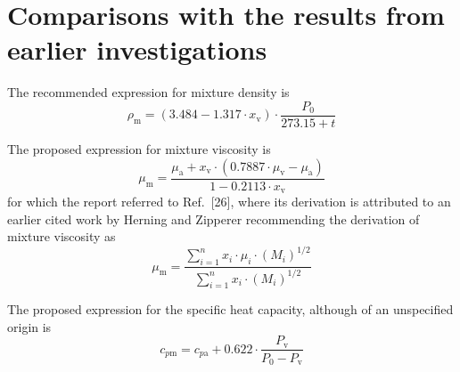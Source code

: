 \documentclass[11pt]{article}
\begin{document}
\section{Comparisons with the results from earlier investigations}


\noindent The recommended expression for mixture density is
\begin{equation}
\rho_\mathrm{m} = (3.484 - 1.317\cdot x_\mathrm{v})
  \cdot\frac{P_0}{273.15+t}
\end{equation}


\noindent The proposed expression for mixture viscosity is
\begin{equation}
\mu_\mathrm{m} = \frac{\mu_\mathrm{a}
  + x_\mathrm{v}\cdot(0.7887\cdot\mu_\mathrm{v}-\mu_\mathrm{a})}
  {1 - 0.2113\cdot x_\mathrm{v}}
\end{equation}
for which the report referred to Ref.~[26], where its derivation is
attributed to an earlier cited work by Herning and Zipperer
recommending the derivation of mixture viscosity as
\begin{equation}
\mu_\mathrm{m} = \frac{\sum_{i=1}^{n} x_i\cdot\mu_i\cdot(M_i)^{1/2}}
                      {\sum_{i=1}^{n} x_i\cdot(M_i)^{1/2}}
\end{equation}


\noindent The proposed expression for the specific heat capacity,
although of an unspecified origin is
\begin{equation}
c_{p\mathrm{m}} = c_{p\mathrm{a}}
  + 0.622\cdot\frac{P_\mathrm{v}}{P_0-P_\mathrm{v}}
\end{equation}

\end{document}
